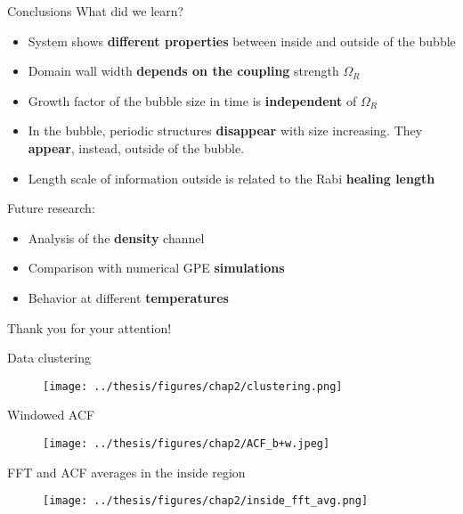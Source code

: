 \documentclass[aspectratio=169]{beamer}
\newcommand{\backupbegin}{
    \newcounter{finalframe}
    \setcounter{finalframe}{\value{framenumber}}
}
\newcommand{\backupend}{
    \setcounter{framenumber}{\value{finalframe}}
}
\begin{document}
\begin{frame}{Conclusions}
  What did we learn?
  \begin{itemize}
    \item System shows \textbf{different properties} between inside and outside of the bubble
    \item Domain wall width \textbf{depends on the coupling} strength $\Omega_R$
    \item Growth factor of the bubble size in time is \textbf{independent} of $\Omega_R$
    \item In the bubble, periodic structures \textbf{disappear} with size increasing. They \textbf{appear}, instead, outside of the bubble.
    \item Length scale of information outside is related to the Rabi \textbf{healing length}
  \end{itemize}
  \pause
  Future research:
  \begin{itemize}
    \item Analysis of the \textbf{density} channel
    \item Comparison with numerical GPE \textbf{simulations}
    \item Behavior at different \textbf{temperatures}
  \end{itemize}
\end{frame}

\begin{frame}
  \huge
  Thank you for your attention!
\end{frame}

\backupbegin
\begin{frame}{Data clustering}
  \begin{figure}
    \centering
    \texttt{[image: ../thesis/figures/chap2/clustering.png]}
  \end{figure}
\end{frame}

\begin{frame}{Windowed ACF}
  \begin{figure}
    \centering
    \texttt{[image: ../thesis/figures/chap2/ACF\_b+w.jpeg]}
  \end{figure}
\end{frame}

\begin{frame}{FFT and ACF averages in the inside region}
  \begin{figure}
    \centering
    \texttt{[image: ../thesis/figures/chap2/inside\_fft\_avg.png]}
  \end{figure}
\end{frame}
\backupend
\end{document}
